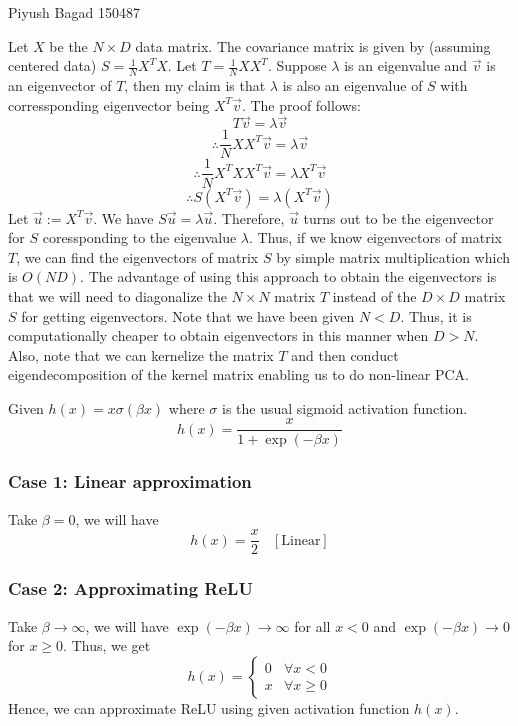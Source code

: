\documentclass[a4paper,11pt]{article}
\begin{document}
{Piyush Bagad}   %
{150487}	%

\begin{mlsolution}
Let $X$ be the $N\times D$ data matrix. The covariance matrix is given by (assuming centered data) $S = \frac{1}{N}X^{T}X$. Let $T  = \frac{1}{N}XX^{T}$. Suppose $\lambda$ is an eigenvalue and $\vec{v}$ is an eigenvector of $T$, then my claim is that 
$\lambda$ is also an eigenvalue of $S$ with corressponding eigenvector being $X^{T}\vec{v}$. The proof follows:
\[
T\vec{v} = \lambda \vec{v}
\]
\[
\therefore \frac{1}{N}XX^{T}\vec{v} = \lambda \vec{v}
\]
\[
\therefore \frac{1}{N}X^{T}XX^{T}\vec{v} = \lambda X^{T}\vec{v}
\]
\[
\therefore S(X^{T}\vec{v}) = \lambda (X^{T}\vec{v})
\]
Let $\vec{u} := X^{T}\vec{v}$. We have $S\vec{u} = \lambda \vec{u}$. Therefore, $\vec{u}$ turns out to be the eigenvector for $S$ coressponding to the eigenvalue $\lambda$. Thus, if we know eigenvectors of matrix $T$, we can find the eigenvectors of matrix $S$ by simple matrix multiplication which is $O(ND)$. The advantage of using this approach to obtain the eigenvectors is that  we will need to diagonalize the $N\times N$ matrix $T$  instead of the $D\times D$ matrix $S$ for getting eigenvectors. Note that we have been given $N <D$. Thus, it is computationally cheaper to obtain eigenvectors in this manner when $D>N$. Also, note that we can kernelize the matrix $T$ and then conduct eigendecomposition of the kernel matrix enabling us to do non-linear PCA. 


\end{mlsolution}

\begin{mlsolution} 

Given $h(x) = x\sigma(\beta x)$ where $\sigma$ is the usual sigmoid activation function.
\[
h(x) = \frac{x}{1+\exp(-\beta x)}
\]

\subsubsection{Case 1: Linear approximation}
Take $\beta = 0$, we will have 
\[
h(x) = \frac{x}{2} \ \ \ \ [\text{Linear}]
\]

\subsubsection{Case 2: Approximating ReLU}
Take $\beta \rightarrow \infty$, we will have $\exp(-\beta x)\rightarrow \infty$ for all $x<0$ and $\exp(-\beta x)\rightarrow 0$ for $x\geq 0$. Thus, we get
\[
h(x) = 
\begin{cases}
0 & \forall x < 0 \\
x & \forall x \geq 0
\end{cases}
\]
Hence, we can approximate ReLU using given activation function $h(x)$.
\end{mlsolution}
\end{document}
